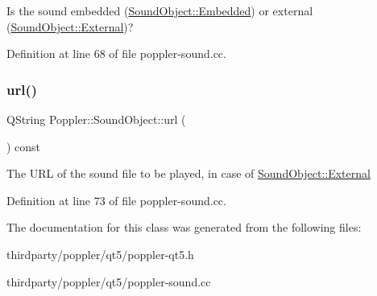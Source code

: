 Is the sound embedded (\hyperlink{class_poppler_1_1_sound_object_ac9f524c6c40abcbb1c9e09c29e020c5bab50528f996b2b62c454d83c472ef27c8}{Sound\+Object\+::\+Embedded}) or external (\hyperlink{class_poppler_1_1_sound_object_ac9f524c6c40abcbb1c9e09c29e020c5ba7336d237089fc02d79d722881b837530}{Sound\+Object\+::\+External})? 

Definition at line 68 of file poppler-\/sound.\+cc.

\mbox{\label{class_poppler_1_1_sound_object_a9c637ebe5e555586f4e42e32777646ec}} 
\subsubsection{\texorpdfstring{url()}{url()}}
{\footnotesize\ttfamily Q\+String Poppler\+::\+Sound\+Object\+::url (\begin{DoxyParamCaption}{ }\end{DoxyParamCaption}) const}

The U\+RL of the sound file to be played, in case of \hyperlink{class_poppler_1_1_sound_object_ac9f524c6c40abcbb1c9e09c29e020c5ba7336d237089fc02d79d722881b837530}{Sound\+Object\+::\+External} 

Definition at line 73 of file poppler-\/sound.\+cc.



The documentation for this class was generated from the following files\+:\begin{DoxyCompactItemize}
\item 
thirdparty/poppler/qt5/poppler-\/qt5.\+h\item 
thirdparty/poppler/qt5/poppler-\/sound.\+cc\end{DoxyCompactItemize}
